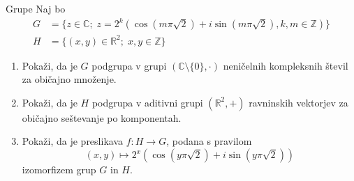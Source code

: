\begin{frame}{Grupe}
	Naj bo
	\begin{align*}
		G &= \{z \in \mathbb{C} ;\; z=2^k(\cos(m\pi \sqrt{2}) + i\sin(m\pi \sqrt{2}),k,m \in \mathbb{Z})\}\\
		H &= \{(x,y)\in\mathbb{R}^2;\;x,y\in\mathbb{Z}\}
	\end{align*}
	\begin{enumerate}
		\item
			Pokaži, da je $G$ podgrupa v grupi $(\mathbb{C}\setminus \{0\}, \cdot)$
			neničelnih kompleksnih števil za običajno množenje.
		\item
			Pokaži, da je $H$ podgrupa v aditivni grupi $(\mathbb{R}^2,+)$
			ravninskih vektorjev za običajno seštevanje po komponentah.
		\item
			Pokaži, da je preslikava $f:H\to G$, podana s pravilom
			$$(x,y)\mapsto2^x(\cos(y\pi\sqrt{2})+i\sin(y\pi\sqrt{2}))$$
			izomorfizem grup $G$ in $H$.
	\end{enumerate}
\end{frame}
